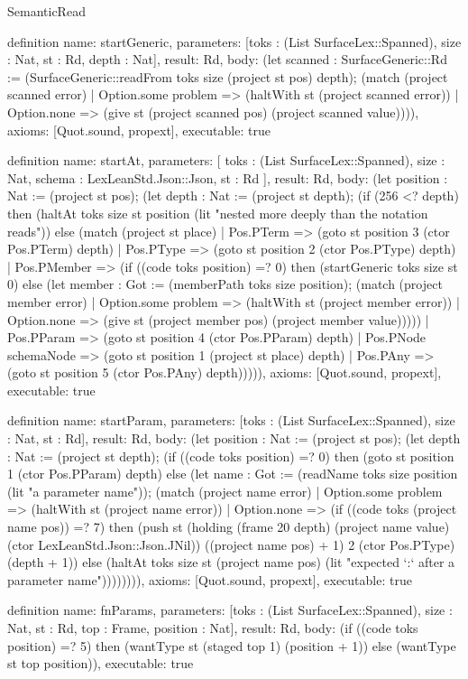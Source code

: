 \begin{lexlean}{SemanticRead}
\begin{semanticmodule}
definition{
  name: startGeneric,
  parameters: [toks : (List SurfaceLex::Spanned), size : Nat, st : Rd, depth : Nat],
  result: Rd,
  body: (let scanned : SurfaceGeneric::Rd := (SurfaceGeneric::readFrom toks size (project st pos) depth); (match (project scanned error)
    | Option.some problem => (haltWith st (project scanned error))
    | Option.none => (give st (project scanned pos) (project scanned value)))),
  axioms: [Quot.sound, propext],
  executable: true
}

definition{
  name: startAt,
  parameters: [
    toks : (List SurfaceLex::Spanned),
    size : Nat,
    schema : LexLeanStd.Json::Json,
    st : Rd
  ],
  result: Rd,
  body: (let position : Nat := (project st pos); (let depth : Nat := (project st depth); (if (256 <? depth) then (haltAt toks size st position (lit "nested more deeply than the notation reads")) else (match (project st place)
    | Pos.PTerm => (goto st position 3 (ctor Pos.PTerm) depth)
    | Pos.PType => (goto st position 2 (ctor Pos.PType) depth)
    | Pos.PMember => (if ((code toks position) =? 0) then (startGeneric toks size st 0) else (let member : Got := (memberPath toks size position); (match (project member error)
      | Option.some problem => (haltWith st (project member error))
      | Option.none => (give st (project member pos) (project member value)))))
    | Pos.PParam => (goto st position 4 (ctor Pos.PParam) depth)
    | Pos.PNode schemaNode => (goto st position 1 (project st place) depth)
    | Pos.PAny => (goto st position 5 (ctor Pos.PAny) depth))))),
  axioms: [Quot.sound, propext],
  executable: true
}

definition{
  name: startParam,
  parameters: [toks : (List SurfaceLex::Spanned), size : Nat, st : Rd],
  result: Rd,
  body: (let position : Nat := (project st pos); (let depth : Nat := (project st depth); (if ((code toks position) =? 0) then (goto st position 1 (ctor Pos.PParam) depth) else (let name : Got := (readName toks size position (lit "a parameter name")); (match (project name error)
    | Option.some problem => (haltWith st (project name error))
    | Option.none => (if ((code toks (project name pos)) =? 7) then (push st (holding (frame 20 depth) (project name value) (ctor LexLeanStd.Json::Json.JNil)) ((project name pos) + 1) 2 (ctor Pos.PType) (depth + 1)) else (haltAt toks size st (project name pos) (lit "expected `:` after a parameter name")))))))),
  axioms: [Quot.sound, propext],
  executable: true
}

definition{
  name: fnParams,
  parameters: [toks : (List SurfaceLex::Spanned), size : Nat, st : Rd, top : Frame, position : Nat],
  result: Rd,
  body: (if ((code toks position) =? 5) then (wantType st (staged top 1) (position + 1)) else (wantType st top position)),
  executable: true
}


\end{semanticmodule}
\end{lexlean}
